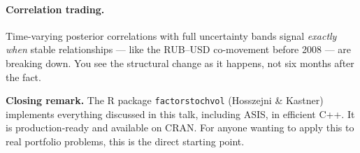 \documentclass[11pt, a4paper]{article}\usepackage[]{graphicx}\usepackage[]{xcolor}
\begin{document}
\paragraph{Correlation trading.}
Time-varying posterior correlations with full uncertainty bands signal
\textit{exactly when} stable relationships --- like the RUB--USD co-movement
before 2008 --- are breaking down.  You see the structural change as it
happens, not six months after the fact.

\begin{remarkbox}
  \textbf{Closing remark.}
  The R package \texttt{factorstochvol} (Hosszejni \& Kastner) implements
  everything discussed in this talk, including ASIS, in efficient C++.
  It is production-ready and available on CRAN.  For anyone wanting to apply
  this to real portfolio problems, this is the direct starting point.
\end{remarkbox}

\end{document}
